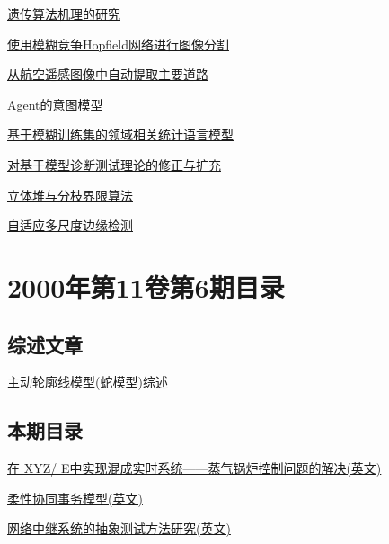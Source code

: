 \documentclass[a4paper]{article}
\begin{document}
\href{http://www.jos.org.cn/ch/reader/download_pdf.aspx?file_no=20000712&year_id=2000&quarter_id=7&falg=1}{遗传算法机理的研究}

\href{http://www.jos.org.cn/ch/reader/download_pdf.aspx?file_no=20000713&year_id=2000&quarter_id=7&falg=1}{使用模糊竞争Hopfield网络进行图像分割}

\href{http://www.jos.org.cn/ch/reader/download_pdf.aspx?file_no=20000714&year_id=2000&quarter_id=7&falg=1}{从航空遥感图像中自动提取主要道路}

\href{http://www.jos.org.cn/ch/reader/download_pdf.aspx?file_no=20000715&year_id=2000&quarter_id=7&falg=1}{Agent的意图模型}

\href{http://www.jos.org.cn/ch/reader/download_pdf.aspx?file_no=20000716&year_id=2000&quarter_id=7&falg=1}{基于模糊训练集的领域相关统计语言模型}

\href{http://www.jos.org.cn/ch/reader/download_pdf.aspx?file_no=20000717&year_id=2000&quarter_id=7&falg=1}{对基于模型诊断测试理论的修正与扩充}

\href{http://www.jos.org.cn/ch/reader/download_pdf.aspx?file_no=20000718&year_id=2000&quarter_id=7&falg=1}{立体堆与分枝界限算法}

\href{http://www.jos.org.cn/ch/reader/download_pdf.aspx?file_no=20000719&year_id=2000&quarter_id=7&falg=1}{自适应多尺度边缘检测}


\section{\textbf{2000年第11卷第6期目录}}
\subsection{综述文章}
\href{http://www.jos.org.cn/ch/reader/download_pdf.aspx?file_no=20000606&year_id=2000&quarter_id=6&falg=1}{主动轮廓线模型(蛇模型)综述}

\subsection{本期目录}
\href{http://www.jos.org.cn/ch/reader/download_pdf.aspx?file_no=20000601&year_id=2000&quarter_id=6&falg=1}{在 XYZ/ E中实现混成实时系统——蒸气锅炉控制问题的解决(英文)}

\href{http://www.jos.org.cn/ch/reader/download_pdf.aspx?file_no=20000602&year_id=2000&quarter_id=6&falg=1}{柔性协同事务模型(英文)}

\href{http://www.jos.org.cn/ch/reader/download_pdf.aspx?file_no=20000603&year_id=2000&quarter_id=6&falg=1}{网络中继系统的抽象测试方法研究(英文)}
\end{document}
